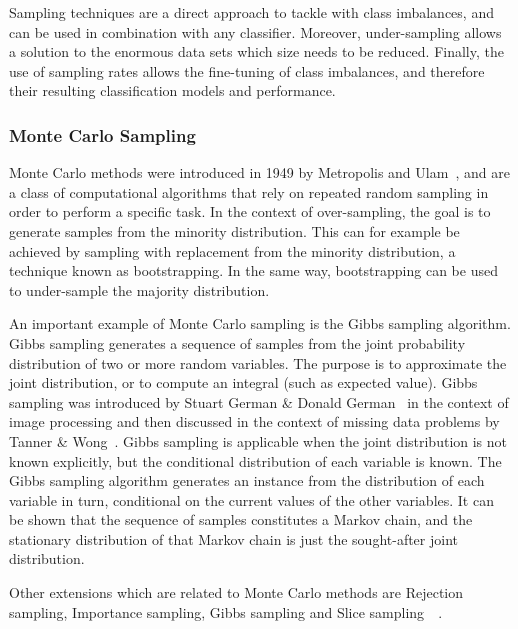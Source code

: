 Sampling techniques are a direct approach to tackle with class imbalances, and can be used in combination with any classifier. Moreover, under-sampling allows a solution to the enormous data sets which size needs to be reduced.  Finally, the use of sampling rates allows the fine-tuning of class imbalances, and therefore their resulting classification models and performance.  

\subsubsection{Monte Carlo Sampling}
Monte Carlo methods were introduced in 1949 by Metropolis and Ulam~\cite{Metropolis49MonteCarlo}, and are a class of computational algorithms that rely on repeated random sampling in order to perform a specific task. In the context of over-sampling, the goal is to generate samples from the minority distribution. This can for example be achieved by sampling with replacement from the minority distribution, a technique known as bootstrapping. In the same way, bootstrapping can be used to under-sample the majority distribution.

An important example of Monte Carlo sampling is the Gibbs sampling algorithm. Gibbs sampling generates a sequence of samples from the joint probability distribution of two or more random variables. The purpose is to approximate the joint distribution, or to compute an integral (such as expected value).  Gibbs sampling was introduced by Stuart German \& Donald German~\cite{Stochastic84} in the context of image processing and then discussed in the context of missing data problems by Tanner \& Wong~\cite{calcpost87}. Gibbs sampling is applicable when the joint distribution is not known explicitly, but the conditional distribution of each variable is known.  The Gibbs sampling algorithm generates an instance from the distribution of each variable in turn, conditional on the current values of the other variables.  It can be shown that the sequence of samples constitutes a Markov chain, and the stationary distribution of that Markov chain is just the sought-after joint distribution. 

Other extensions which are related to Monte Carlo methods are Rejection sampling, Importance sampling, Gibbs sampling and Slice sampling~\cite{bishop}~\cite{Neal03slicesampling}.

